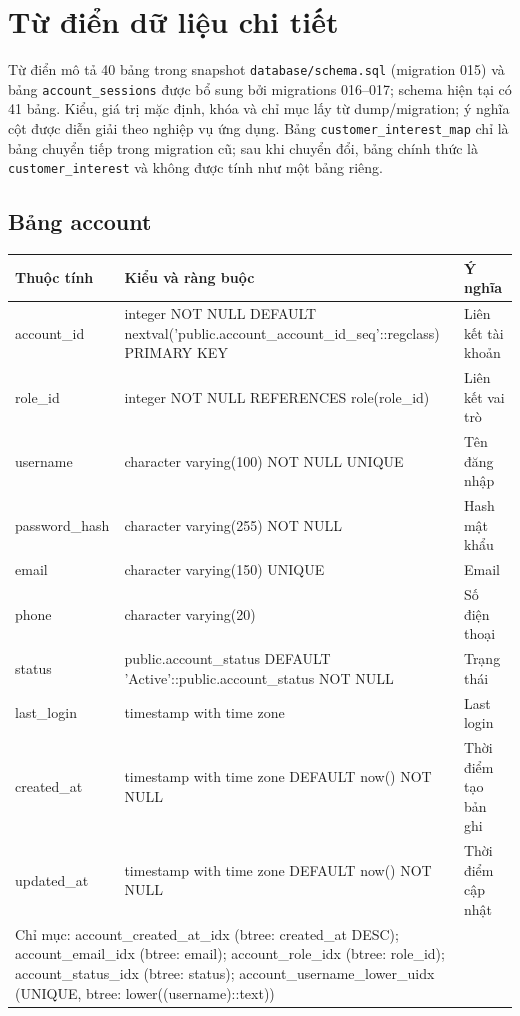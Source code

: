 \chapter{Từ điển dữ liệu chi tiết}
Từ điển mô tả 40 bảng trong snapshot \texttt{database/schema.sql} (migration 015) và bảng \texttt{account\_sessions} được bổ sung bởi migrations 016--017; schema hiện tại có 41 bảng. Kiểu, giá trị mặc định, khóa và chỉ mục lấy từ dump/migration; ý nghĩa cột được diễn giải theo nghiệp vụ ứng dụng.
Bảng \texttt{customer\_interest\_map} chỉ là bảng chuyển tiếp trong migration cũ; sau khi chuyển đổi, bảng chính thức là \texttt{customer\_interest} và không được tính như một bảng riêng.
\small
\section{Bảng account}
\begin{longtable}{|p{}|p{}|p{}|}\hline
\textbf{Thuộc tính}&\textbf{Kiểu và ràng buộc}&\textbf{Ý nghĩa}\\\hline\endhead
account\_id & integer NOT NULL DEFAULT nextval('public.account\_account\_id\_seq'::regclass) PRIMARY KEY & Liên kết tài khoản\\\hline
role\_id & integer NOT NULL REFERENCES role(role\_id) & Liên kết vai trò\\\hline
username & character varying(100) NOT NULL UNIQUE & Tên đăng nhập\\\hline
password\_hash & character varying(255) NOT NULL & Hash mật khẩu\\\hline
email & character varying(150) UNIQUE & Email\\\hline
phone & character varying(20) & Số điện thoại\\\hline
status & public.account\_status DEFAULT 'Active'::public.account\_status NOT NULL & Trạng thái\\\hline
last\_login & timestamp with time zone & Last login\\\hline
created\_at & timestamp with time zone DEFAULT now() NOT NULL & Thời điểm tạo bản ghi\\\hline
updated\_at & timestamp with time zone DEFAULT now() NOT NULL & Thời điểm cập nhật\\\hline
\multicolumn{3}{|p{0.93\textwidth}|}{Chỉ mục: account\_created\_at\_idx (btree: created\_at DESC); account\_email\_idx (btree: email); account\_role\_idx (btree: role\_id); account\_status\_idx (btree: status); account\_username\_lower\_uidx (UNIQUE, btree: lower((username)::text))}\\\hline
\end{longtable}
\normalsize
